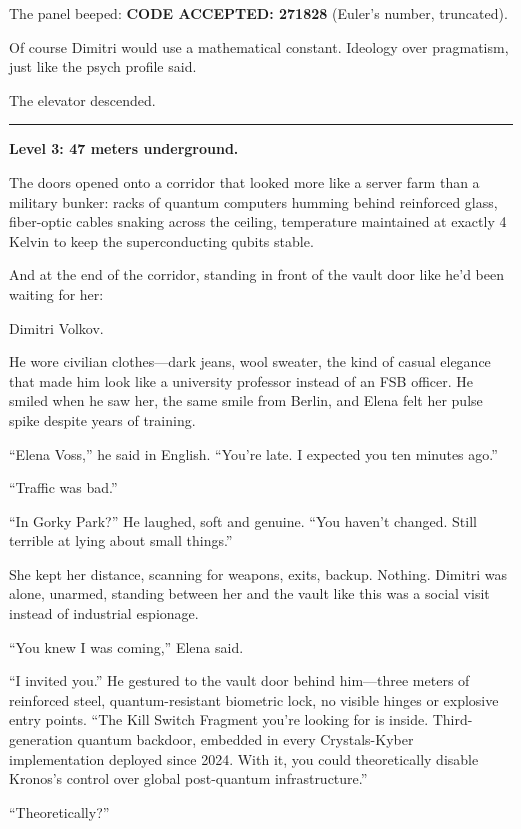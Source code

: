 The panel beeped: \textbf{CODE ACCEPTED: 271828} (Euler's number, truncated).

Of course Dimitri would use a mathematical constant. Ideology over pragmatism, just like the psych profile said.

The elevator descended.

\begin{center}\rule{0.5\linewidth}{0.5pt}\end{center}

\textbf{Level 3: 47 meters underground.}

The doors opened onto a corridor that looked more like a server farm than a military bunker: racks of quantum computers humming behind reinforced glass, fiber-optic cables snaking across the ceiling, temperature maintained at exactly 4 Kelvin to keep the superconducting qubits stable.

And at the end of the corridor, standing in front of the vault door like he'd been waiting for her:

Dimitri Volkov.

He wore civilian clothes---dark jeans, wool sweater, the kind of casual elegance that made him look like a university professor instead of an FSB officer. He smiled when he saw her, the same smile from Berlin, and Elena felt her pulse spike despite years of training.

``Elena Voss,'' he said in English. ``You're late. I expected you ten minutes ago.''

``Traffic was bad.''

``In Gorky Park?'' He laughed, soft and genuine. ``You haven't changed. Still terrible at lying about small things.''

She kept her distance, scanning for weapons, exits, backup. Nothing. Dimitri was alone, unarmed, standing between her and the vault like this was a social visit instead of industrial espionage.

``You knew I was coming,'' Elena said.

``I invited you.'' He gestured to the vault door behind him---three meters of reinforced steel, quantum-resistant biometric lock, no visible hinges or explosive entry points. ``The Kill Switch Fragment you're looking for is inside. Third-generation quantum backdoor, embedded in every Crystals-Kyber implementation deployed since 2024. With it, you could theoretically disable Kronos's control over global post-quantum infrastructure.''

``Theoretically?''


